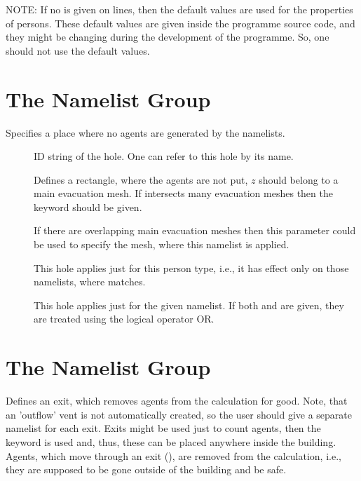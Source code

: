 \documentclass[12pt,a4paper,final,twoside]{stylevk}
\begin{document}
\noindent NOTE: If no  is given on  lines,
then the default values are used for the properties of persons.  These
default values are given inside the programme source code, and they
might be changing during the development of the programme.  So, one
should not use the default values.


\section{The  Namelist Group}\label{Sec_EvhoNML}

\noindent Specifies a place where no agents are generated by the
 namelists.
%
\begin{description}
%
\item[] ID string of the hole.  One can refer to this hole
  by its name.
%
\item[] Defines a rectangle, where the agents are not put,
  $z$ should belong to a main evacuation mesh.  If 
  intersects many evacuation meshes then the keyword 
  should be given.
%
\item[] If there are overlapping main evacuation
  meshes then this parameter could be used to specify the mesh, where
  this  namelist is applied.
%
\item[] This hole applies just for this person type,
  i.e., it has effect only on those  namelists,
  where  matches.
%
\item[] This hole applies just for the given 
  namelist.  If both  and  are given, they
  are treated using the logical operator OR.
%
\end{description}


\section{The  Namelist Group}\label{Sec_ExitNML}

\noindent Defines an exit, which removes agents from the calculation
for good.  Note, that an 'outflow' vent is not automatically created,
so the user should give a separate  namelist for each
exit.  Exits might be used just to count agents, then the keyword
  is used and, thus, these can be placed
anywhere inside the building.  Agents, which move through an exit
(), are removed from the calculation,
i.e., they are supposed to be gone outside of the building and
be safe.
\end{document}
